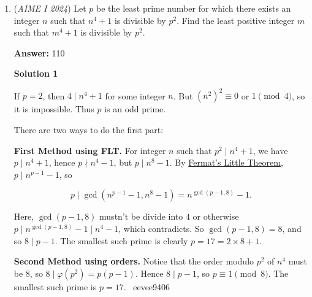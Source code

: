 \begin{enumerate}
 To solve these equations, we get $x' = \frac{1}{8^2 \cdot 18 \pi^4}$ and $y' = \frac{1}{8 \cdot 18 \pi^3}$.Therefore, two functions' two monotonic pieces that attain $\left( 1, 1 \right)$ have two intersecting points.

 Putting all analysis above, the total number of intersecting points is $16 \cdot 4 \cdot 6 + 1 = \boxed{\textbf{(385) }}$.

 


 \textbf{Drawing of two solutions near $\left( 1, 1 \right)$} \href{https://artofproblemsolving.com/wiki/index.php/File:2024\_AIME\_I\_Problem\_12,\_two\_solutions\_near\_(1,1).png}{https://artofproblemsolving.com/wiki/index.php/File:2024\_AIME\_I\_Problem\_12,\_two\_solutions\_near\_(1,1).png}

 


 


	\item (\textit{AIME I 2024}) Let $p$ be the least prime number for which there exists an integer $n$ such that $n^{4}+1$ is divisible by $p^{2}$. Find the least positive integer $m$ such that $m^{4}+1$ is divisible by $p^{2}$.


 
 \textbf{Answer: }110



\textbf{Solution 1}

If \(p=2\), then \(4\mid n^4+1\) for some integer \(n\). But \(\left(n^2\right)^2\equiv0\) or \(1\pmod4\), so it is impossible. Thus \(p\) is an odd prime.

 There are two ways to do the first part:

 \textbf{First Method using FLT.} For integer \(n\) such that \(p^2\mid n^4+1\), we have \(p\mid n^4+1\), hence \(p\nmid n^4-1\), but \(p\mid n^8-1\). By \href{https://artofproblemsolving.com/wiki/index.php?title=Fermat\%27s\_Little\_Theorem}{Fermat's Little Theorem}, \(p\mid n^{p-1}-1\), so

 \begin{equation*}p\mid\gcd\left(n^{p-1}-1,n^8-1\right)=n^{\gcd(p-1,8)}-1.\end{equation*}

 Here, \(\gcd(p-1,8)\) mustn't be divide into \(4\) or otherwise \(p\mid n^{\gcd(p-1,8)}-1\mid n^4-1\), which contradicts. So \(\gcd(p-1,8)=8\), and so \(8\mid p-1\). The smallest such prime is clearly \(p=17=2\times8+1\).

 
\textbf{Second Method using orders.} Notice that the order modulo $p^2$ of $n^4$ must be $8$, so $8\mid\varphi(p^2)=p(p-1)$. Hence $8\mid p-1$, so $p\equiv 1\pmod{8}$. The smallest such prime is $p=17$. ~eevee9406


\end{enumerate}
